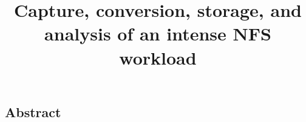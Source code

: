 \documentclass[twocolumn, 10pt]{article}
\begin{document}
\title{\Large \bf Capture, conversion, storage, and analysis of an intense NFS workload}


\maketitle


\subsection*{Abstract}










\end{document}
